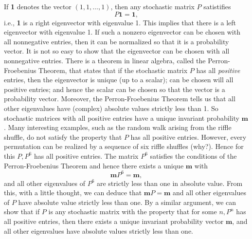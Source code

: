 \documentclass{stml-l}
\theoremstyle{definition}
\numberwithin{equation}{chapter}
\numberwithin{figure}{chapter}
\numberwithin{figure}{section}
\begin{document}
If \textbf{1} denotes the vector $(1,1,\ldots,1)$, then any
stochastic matrix $P$ satistifies
\begin{equation*}
P\mathbf{1}=\mathbf{1},
\end{equation*}
i.e., \textbf{1} is a right eigenvector with eigenvalue 1. This
implies that there is a left eigenvector with eigenvalue 1. If such
a nonzero eigenvector can be chosen with all nonnegative entries,
then it can be normalized so that it is a probability vector. It is
not so easy to show that the eigenvector can be chosen with all
nonnegative entries. There is a theorem in linear algebra, called
the Perron-Froebenius Theorem, that states that if the stochastic
matrix $P$ has all \emph{positive} entries, then the eigenvector is
unique (up to a scalar); can be chosen will all positive entries;
and hence the scalar can be chosen so that the vector is a
probability vector. Moreover, the Perron-Froebenius Theorem tells us
that all other eigenvalues have (complex) absolute values strictly
less than 1. So stochastic matrices with all positive entries have a
unique invariant probability $\mathbf{m}$. Many interesting
examples, such as the random walk arising from the riffle shuffle,
do not satisfy the property that $P$ has all positive entries.
However, every permutation can be realized by a sequence of six
riffle shuffles (why?). Hence for this $P,P^{6}$ has all positive
entries. The matrix $P^{6}$ satisfies the conditions of the
Perron-Froebenius Theorem and hence there exists a unique
$\mathbf{m}$ with
\begin{equation*}
\mathbf{m}P^{6}=\mathbf{m},
\end{equation*}
and all other eigenvalues of $P^{6}$ are strictly less than one in
absolute value. From this, with a little thought, we can deduce that
$\mathbf{m}P=\mathbf{m}$ and all other eigenvalues of $P$ have
absolute value strictly less than one. By a similar argument, we can
show that if $P$ is any stochastic matrix with the property that for
some $n,P^{n}$ has all positive entries, then there exists a unique
invariant probability vector $\mathbf{m}$, and all other eigenvalues
have absolute values strictly less than one.
\end{document}
